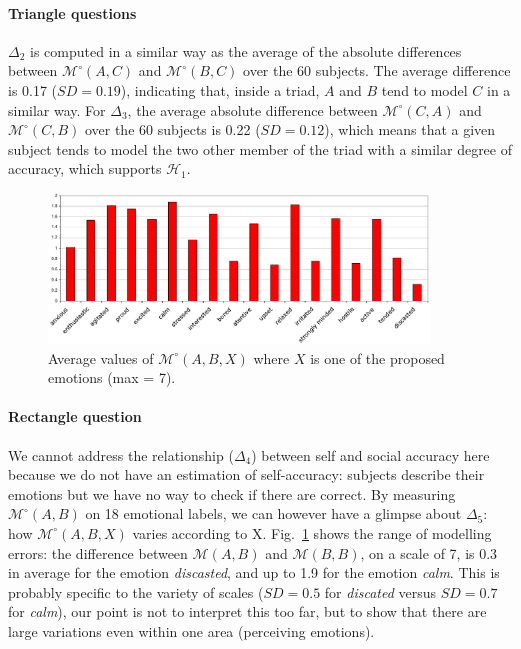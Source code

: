 \documentclass[natbib]{svjour3}
\newcommand{\gmodel}[2]{{$\mathcal{M}(#1, #2)$}}
\newcommand{\Model}[3]{{$\mathcal{M}^{\circ}(#1, #2, #3)$}}
\newcommand{\gModel}[2]{{$\mathcal{M}^{\circ}(#1, #2)$}}
\begin{document}
\paragraph{Triangle questions} $\Delta_2$ is computed in a similar way as the average of
the absolute differences between \gModel{A}{C} and \gModel{B}{C} over the 60
subjects. The average difference is 0.17 ($SD= 0.19$), indicating that, inside a
triad, $A$ and $B$ tend to model $C$ in a similar way. For $\Delta_3$, the
average absolute difference between \gModel{C}{A} and \gModel{C}{B} over the 60
subjects is 0.22 ($SD= 0.12$), which means that a given subject tends to model
the two other member of the triad with a similar degree of accuracy, which
supports $\mathcal{H}_{1}$.

\begin{figure}[ht!]
        \centering
        \includegraphics[width=0.9\textwidth]{image9.pdf}
        \caption{Average values of \Model{A}{B}{X} where $X$ is one of the proposed
        emotions (max = 7).}
        \label{study3:deg_m_values}
\end{figure}


\paragraph{Rectangle question} We cannot address the relationship ($\Delta_4$)
between self and social accuracy here because we do not have an estimation of
self-accuracy: subjects describe their emotions but we have no way to check if
there are correct. By measuring \gModel{A}{B} on  18 emotional labels,
we can however have a glimpse about $\Delta_5$: how \Model{A}{B}{X} varies
according to X.  Fig.~\ref{study3:deg_m_values} shows the range of modelling
errors: the difference between \gmodel{A}{B} and \gmodel{B}{B}, on a scale of 7,
is 0.3 in average for the emotion \emph{discasted}, and up to 1.9 for the
emotion \emph{calm}. This is probably specific to the variety of scales  ($SD=
0.5$ for \emph{discated} versus $SD=0.7$ for \emph{calm}), our point is not to
interpret this too far, but to show that there are large variations even within one
area  (perceiving emotions).
\end{document}
